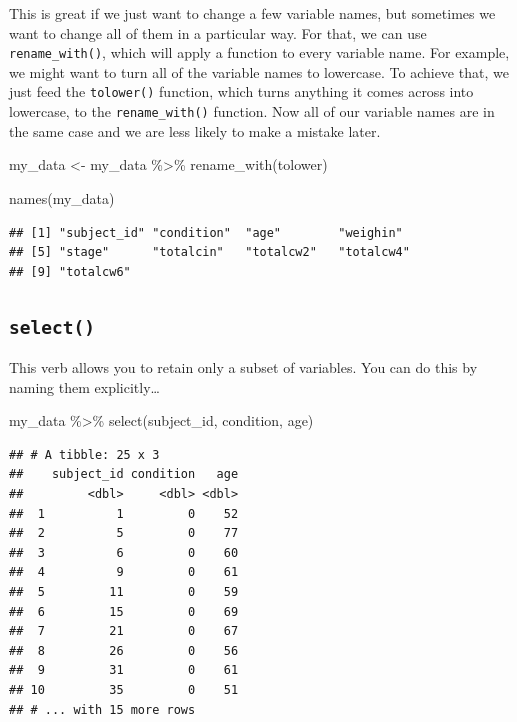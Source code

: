 \documentclass[
]{book}
\newenvironment{Shaded}{\begin{snugshade}}{\end{snugshade}}
\newcommand{\FunctionTok}[1]{\textcolor[rgb]{0.00,0.00,0.00}{#1}}
\newcommand{\NormalTok}[1]{#1}
\newcommand{\OtherTok}[1]{\textcolor[rgb]{0.56,0.35,0.01}{#1}}
\newcommand{\SpecialCharTok}[1]{\textcolor[rgb]{0.00,0.00,0.00}{#1}}
\begin{document}
This is great if we just want to change a few variable names, but sometimes we want to change all of them in a particular way. For that, we can use \texttt{rename\_with()}, which will apply a function to every variable name. For example, we might want to turn all of the variable names to lowercase. To achieve that, we just feed the \texttt{tolower()} function, which turns anything it comes across into lowercase, to the \texttt{rename\_with()} function. Now all of our variable names are in the same case and we are less likely to make a mistake later.

\begin{Shaded}
\begin{Highlighting}[]
\NormalTok{my\_data }\OtherTok{\textless{}{-}}\NormalTok{ my\_data }\SpecialCharTok{\%\textgreater{}\%} 
  \FunctionTok{rename\_with}\NormalTok{(tolower)}

\FunctionTok{names}\NormalTok{(my\_data)}
\end{Highlighting}
\end{Shaded}

\begin{verbatim}
## [1] "subject_id" "condition"  "age"        "weighin"   
## [5] "stage"      "totalcin"   "totalcw2"   "totalcw4"  
## [9] "totalcw6"
\end{verbatim}

\hypertarget{select}{%
\subsection{\texorpdfstring{\texttt{select()}}{select()}}\label{select}}

This verb allows you to retain only a subset of variables. You can do this by naming them explicitly\ldots{}

\begin{Shaded}
\begin{Highlighting}[]
\NormalTok{my\_data }\SpecialCharTok{\%\textgreater{}\%} 
  \FunctionTok{select}\NormalTok{(subject\_id, condition, age)}
\end{Highlighting}
\end{Shaded}

\begin{verbatim}
## # A tibble: 25 x 3
##    subject_id condition   age
##         <dbl>     <dbl> <dbl>
##  1          1         0    52
##  2          5         0    77
##  3          6         0    60
##  4          9         0    61
##  5         11         0    59
##  6         15         0    69
##  7         21         0    67
##  8         26         0    56
##  9         31         0    61
## 10         35         0    51
## # ... with 15 more rows
\end{verbatim}
\end{document}
